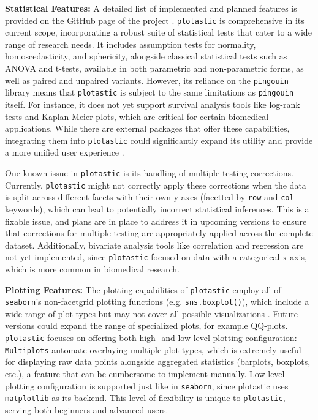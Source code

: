 \textbf{Statistical Features:}
A detailed list of implemented and planned features is provided on the GitHub
page of the project \cite{kuricMarkur4Plotastic2024}. \texttt{plotastic} is
comprehensive in its current scope, incorporating a robust suite of statistical
tests that cater to a wide range of research needs. It includes assumption tests
for normality, homoscedasticity, and sphericity, alongside classical statistical
tests such as ANOVA and t-tests, available in both parametric and non-parametric
forms, as well as paired and unpaired variants. However, its reliance on the
\texttt{pingouin} library means that \texttt{plotastic} is subject to the same
limitations as \texttt{pingouin} itself. For instance, it does not yet support
survival analysis tools like log-rank tests and Kaplan-Meier plots, which are
critical for certain biomedical applications. While there are external packages
that offer these capabilities, integrating them into \texttt{plotastic} could
significantly expand its utility and provide a more unified user experience
\cite{davidson-pilonLifelinesSurvivalAnalysis2019}.

One known issue in \texttt{plotastic} is its handling of multiple testing
corrections. Currently, \texttt{plotastic} might not correctly apply these
corrections when the data is split across different facets with their own y-axes
(facetted by \texttt{row} and \texttt{col} keywords), which can lead to
potentially incorrect statistical inferences. This is a fixable issue, and plans
are in place to address it in upcoming versions to ensure that corrections for
multiple testing are appropriately applied across the complete dataset.
Additionally, bivariate analysis tools like correlation and regression are not
yet implemented, since \texttt{plotastic} focused on data with a categorical
x-axis, which is more common in biomedical research.


\textbf{Plotting Features:} The plotting capabilities of \texttt{plotastic}
employ all of \texttt{seaborn}'s non-facetgrid plotting functions (e.g.
\texttt{sns.boxplot()}), which include a wide range of plot types but may not
cover all possible visualizations \cite{waskomSeabornStatisticalData2021}.
Future versions could expand the range of specialized plots, for example
QQ-plots. \texttt{plotastic} focuses on offering both high- and low-level
plotting configuration: \texttt{Multiplots} automate overlaying multiple plot
types, which is extremely useful for displaying raw data points alongside
aggregated statistics (barplots, boxplots, etc.), a feature that can be
cumbersome to implement manually. Low-level plotting configuration is supported
just like in \texttt{seaborn}, since plotastic uses \texttt{matplotlib} as its
backend. This level of flexibility is unique to \texttt{plotastic}, serving both
beginners and advanced users.

